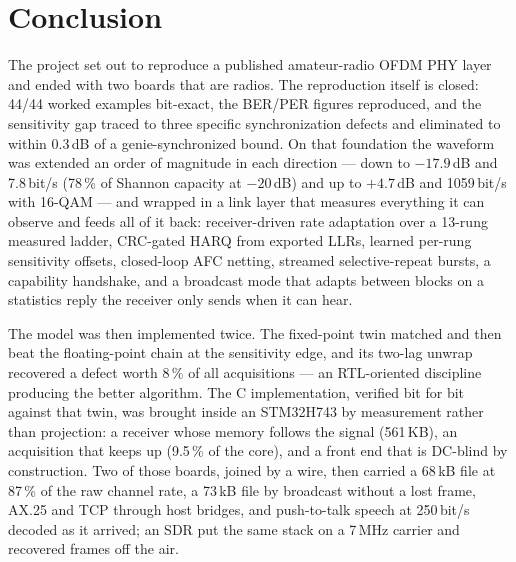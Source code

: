\section{Conclusion}
\label{sec:conclusion}

The project set out to reproduce a published amateur-radio OFDM PHY
layer and ended with two boards that are radios.  The reproduction
itself is closed: 44/44 worked examples bit-exact, the BER/PER figures
reproduced, and the sensitivity gap traced to three specific
synchronization defects and eliminated to within 0.3\,dB of a
genie-synchronized bound.  On that foundation the waveform was
extended an order of magnitude in each direction --- down to
$-17.9$\,dB and 7.8\,bit/s (78\,\% of Shannon capacity at $-20$\,dB)
and up to $+4.7$\,dB and 1059\,bit/s with 16-QAM --- and wrapped in a
link layer that measures everything it can observe and feeds all of it
back: receiver-driven rate adaptation over a 13-rung measured ladder,
CRC-gated HARQ from exported LLRs, learned per-rung sensitivity
offsets, closed-loop AFC netting, streamed selective-repeat bursts, a
capability handshake, and a broadcast mode that adapts between blocks
on a statistics reply the receiver only sends when it can hear.

The model was then implemented twice.  The fixed-point twin matched
and then beat the floating-point chain at the sensitivity edge, and its
two-lag unwrap recovered a defect worth 8\,\% of all acquisitions ---
an RTL-oriented discipline producing the better algorithm.  The C
implementation, verified bit for bit against that twin, was brought
inside an STM32H743 by measurement rather than projection: a receiver
whose memory follows the signal (561\,KB), an acquisition that keeps
up (9.5\,\% of the core), and a front end that is DC-blind by
construction.  Two of those boards, joined by a wire, then carried a
68\,kB file at 87\,\% of the raw channel rate, a 73\,kB file by
broadcast without a lost frame, AX.25 and TCP through host bridges,
and push-to-talk speech at 250\,bit/s decoded as it arrived; an SDR
put the same stack on a 7\,MHz carrier and recovered frames off the
air.

